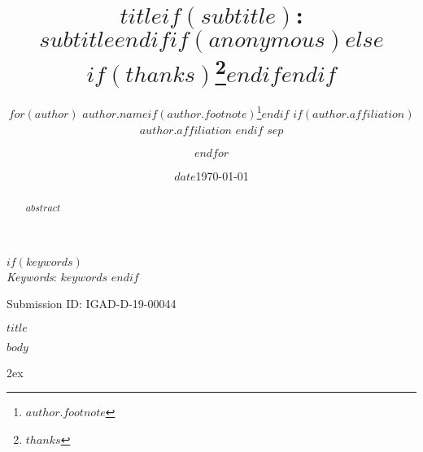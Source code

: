 \documentclass[12pt,notitlepage]{article}
\title{$title$$if(subtitle)$: 
           \\ $subtitle$$endif$$if(anonymous)$$else$$if(thanks)$\thanks{$thanks$}$endif$$endif$}
\author{$for(author)$ %
            $author.name$$if(author.footnote)$\footnote{$author.footnote$}$endif$ $if(author.affiliation)$ \\ \emph{$author.affiliation$} $endif$
            $sep$ \and 
          $endfor$}
\date{$date$}
\date{\today}
\newcounter{def}
\begin{document}
	


	
	\maketitle
	
	\singlespacing
	\begin{abstract}
	$abstract$
	\end{abstract} \hspace{10pt}
	
	    $if(keywords)$ 
      \hfill \\ 
      \noindent \emph{Keywords}: $keywords$ 
    $endif$
	
	Submission ID: IGAD-D-19-00044
	\thispagestyle{empty}
	
	\newpage
	\clearpage
	
	\doublespacing
	
	$title$
	
	$body$
	
	\newpage
	
	\theendnotes
		
	\begingroup
	\parindent 0pt
	\parskip 2ex
	\def\enotesize{\normalsize}
	\endgroup
	
	\newpage
		\singlespacing
	
	
\end{document}
